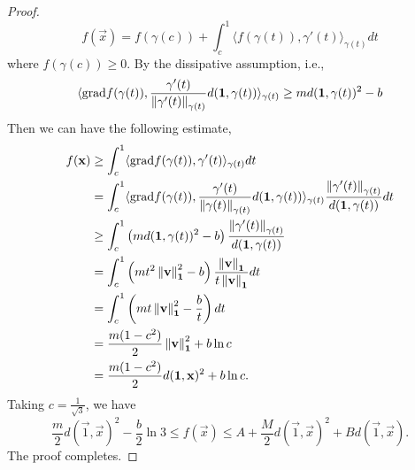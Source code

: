 \begin{proof}
\[
f(\vec{x})=f(\gamma(c))+\int_c^{1}\langle f(\gamma(t)),\gamma'(t)\rangle_{\gamma(t)}dt
\]
where $f(\gamma(c))\ge 0$. By the dissipative assumption, i.e.,
\[
\langle\mathrm{grad} f(\gamma(t)),\frac{\gamma'(t)}{\left\Vert \gamma'(t) \right\Vert_{\gamma(t)}}d(\mathbf{1},\gamma(t))\rangle_{\gamma(t)}\ge md(\mathbf{1},\gamma(t))^2-b
\]
Then we can have the following estimate,
\begin{equation}
\begin{split}
f(\mathbf{x})&\ge\int_c^{1}\langle\mathrm{grad} f(\gamma(t)),\gamma'(t)\rangle_{\gamma(t)}dt
\\
&=\int_c^1\langle\mathrm{grad} f(\gamma(t)),\frac{\gamma'(t)}{\left\Vert \gamma(t) \right\Vert_{\gamma(t)}}d(\mathbf{1},\gamma(t))\rangle_{\gamma(t)}\frac{\left\Vert \gamma'(t) \right\Vert_{\gamma(t)}}{d(\mathbf{1},\gamma(t))}dt
\\
&\ge\int_c^1\left(md(\mathbf{1},\gamma(t))^2-b\right)\frac{\left\Vert \gamma'(t) \right\Vert_{\gamma(t)}}{d(\mathbf{1},\gamma(t))}
\\
&=\int_c^1\left(mt^2\left\Vert \mathbf{v} \right\Vert_{\mathbf{1}}^2-b\right)\frac{\left\Vert \mathbf{v} \right\Vert_{\mathbf{1}}}{t\left\Vert \mathbf{v} \right\Vert_{\mathbf{1}}}dt
\\
&=\int_c^1\left(mt\left\Vert \mathbf{v} \right\Vert_{\mathbf{1}}^2-\frac{b}{t}\right)dt
\\
&=\frac{m(1-c^2)}{2}\left\Vert \mathbf{v} \right\Vert_{\mathbf{1}}^2+b\ln c
\\
&=\frac{m(1-c^2)}{2}d(\mathbf{1},\mathbf{x})^2+b\ln c.
\end{split}
\end{equation}
Taking $c=\frac{1}{\sqrt{3}}$, we have 
\[
\frac{m}{2}d(\vec{1},\vec{x})^2-\frac{b}{2}\ln 3\le f(\vec{x})\le A+\frac{M}{2}d(\vec{1},\vec{x})^2+Bd(\vec{1},\vec{x}).
\]
The proof completes.

\end{proof}








